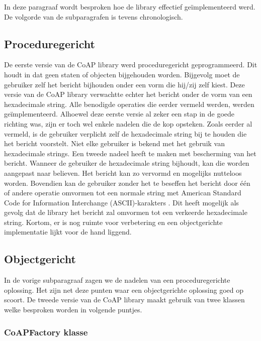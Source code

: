 In deze paragraaf wordt besproken hoe de library effectief ge\"{i}mplementeerd werd. De volgorde van de subparagrafen is tevens chronologisch. 

\subsection{Proceduregericht}

De eerste versie van de CoAP library werd proceduregericht geprogrammeerd. Dit houdt in dat geen staten of objecten bijgehouden worden. Bijgevolg moet de gebruiker zelf het bericht bijhouden onder een vorm die hij/zij zelf kiest. Deze versie van de CoAP library verwachtte echter het bericht onder de vorm van een hexadecimale string. Alle benodigde operaties die eerder vermeld werden, werden ge\"{i}mplementeerd. Alhoewel deze eerste versie al zeker een stap in de goede richting was, zijn er toch wel enkele nadelen die de kop opsteken. Zoals eerder al vermeld, is de gebruiker verplicht zelf de hexadecimale string bij te houden die het bericht voorstelt. Niet elke gebruiker is bekend met het gebruik van hexadecimale strings. Een tweede nadeel heeft te maken met bescherming van het bericht. Wanneer de gebruiker de hexadecimale string bijhoudt, kan die worden aangepast naar believen. Het bericht kan zo vervormd en mogelijks nutteloos worden. Bovendien kan de gebruiker zonder het te beseffen het bericht door \'{e}\'{e}n of andere operatie omvormen tot een normale string met American Standard Code for Information Interchange (ASCII)-karakters . Dit heeft mogelijk als gevolg dat de library het bericht zal omvormen tot een verkeerde hexadecimale string. Kortom, er is nog ruimte voor verbetering en een objectgerichte implementatie lijkt voor de hand liggend.

\subsection{Objectgericht}

In de vorige subparagraaf zagen we de nadelen van een proceduregerichte oplossing. Het zijn net deze punten waar een objectgerichte oplossing goed op scoort. De tweede versie van de CoAP library maakt gebruik van twee klassen welke besproken worden in volgende puntjes.

\subsubsection{CoAPFactory klasse}

